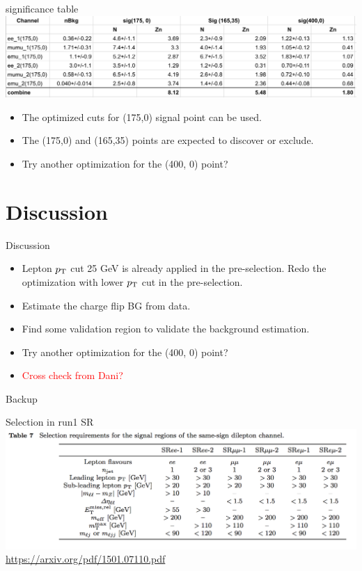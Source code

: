 \documentclass[mathserif,serif]{beamer}
\begin{document}
\begin{frame}{significance table}
\includegraphics[width=\textwidth]{data/optimization/dongliang.png}
\begin{itemize}
\item The optimized cuts for (175,0) signal point can be used.
\item The (175,0) and (165,35) points are expected to discover or exclude.
\item Try another optimization for the (400, 0) point?
\end{itemize}
\end{frame}

\section{Discussion}
\begin{frame}{Discussion}
\begin{itemize}
\item Lepton $p_{\text{T}}$ cut 25 GeV is already applied in the pre-selection. Redo the optimization with lower $p_{\text{T}}$ cut in the pre-selection.
\item Estimate the charge flip BG from data.
\item Find some validation region to validate the background estimation.
\item Try another optimization for the (400, 0) point?
\item \textcolor{red}{Cross check from Dani?}
\end{itemize}
\end{frame}

\begin{frame}
\begin{center}
\huge
Backup
\end{center}
\end{frame}

\begin{frame}{Selection in run1 SR}
\includegraphics[width=\textwidth]{data/photo/SRcutrun1.png} \\
\url{https://arxiv.org/pdf/1501.07110.pdf}
\end{frame}
\end{document}

